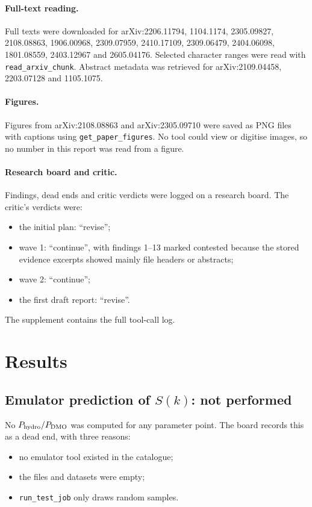 \documentclass[11pt,a4paper]{article}
\begin{document}
\paragraph{Full-text reading.} Full texts were downloaded for arXiv:2206.11794, 1104.1174, 2305.09827, 2108.08863, 1906.00968, 2309.07959, 2410.17109, 2309.06479, 2404.06098, 1801.08559, 2403.12967 and 2605.04176. Selected character ranges were read with \texttt{read\_arxiv\_chunk}. Abstract metadata was retrieved for arXiv:2109.04458, 2203.07128 and 1105.1075.

\paragraph{Figures.} Figures from arXiv:2108.08863 and arXiv:2305.09710 were saved as PNG files with captions using \texttt{get\_paper\_figures}. No tool could view or digitise images, so no number in this report was read from a figure.

\paragraph{Research board and critic.} Findings, dead ends and critic verdicts were logged on a research board. The critic's verdicts were:
\begin{itemize}
\item the initial plan: ``revise'';
\item wave 1: ``continue'', with findings 1--13 marked contested because the stored evidence excerpts showed mainly file headers or abstracts;
\item wave 2: ``continue'';
\item the first draft report: ``revise''.
\end{itemize}
The supplement contains the full tool-call log.

\section{Results}
\subsection{Emulator prediction of $S(k)$: not performed}
No $P_{\rm hydro}/P_{\rm DMO}$ was computed for any parameter point. The board records this as a dead end, with three reasons:
\begin{itemize}
\item no emulator tool existed in the catalogue;
\item the files and datasets were empty;
\item \texttt{run\_test\_job} only draws random samples.
\end{itemize}
\end{document}
